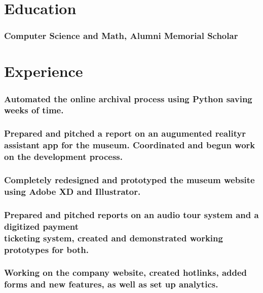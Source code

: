 \documentclass[a4paper]{resume}
\begin{document}
\vspace*{-40pt}


\section{Education}
\subsubsection{Computer Science and Math, Alumni Memorial Scholar}

\section{Experience}
\subsubsection{Automated the online archival process using Python saving weeks of time.}
\subsubsection{Prepared and pitched a report on an augumented realityr assistant app for the museum. Coordinated and begun work on the development process.}
\subsubsection{Completely redesigned and prototyped the museum website using Adobe XD and Illustrator.}
\subsubsection{Prepared and pitched reports on an audio tour system and a digitized payment\\ticketing system, created and demonstrated working prototypes for both.}

\subsubsection{Working on the company website, created hotlinks, added forms and new features, as well as set up analytics.}
\end{document}

